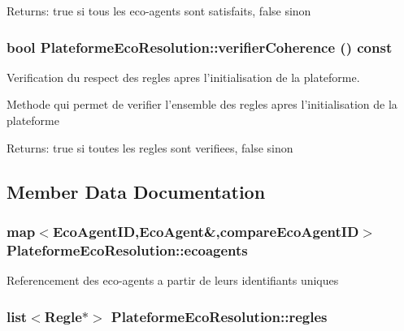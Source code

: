 \begin{Desc}
\item[Returns:]true si tous les eco-agents sont satisfaits, false sinon \end{Desc}
\hypertarget{classPlateformeEcoResolution_0d35ee702a0b255f0da91aa382089865}{
\subsubsection[{verifierCoherence}]{\setlength{\rightskip}{0pt plus 5cm}bool PlateformeEcoResolution::verifierCoherence () const}}
\label{classPlateformeEcoResolution_0d35ee702a0b255f0da91aa382089865}


Verification du respect des regles apres l'initialisation de la plateforme. 

Methode qui permet de verifier l'ensemble des regles apres l'initialisation de la plateforme

\begin{Desc}
\item[Returns:]true si toutes les regles sont verifiees, false sinon \end{Desc}


\subsection{Member Data Documentation}
\hypertarget{classPlateformeEcoResolution_02de97d0d9dac3719ceaadfb255492a3}{
\subsubsection[{ecoagents}]{\setlength{\rightskip}{0pt plus 5cm}map$<${\bf EcoAgentID},{\bf EcoAgent}\&,{\bf compareEcoAgentID}$>$ {\bf PlateformeEcoResolution::ecoagents}}}
\label{classPlateformeEcoResolution_02de97d0d9dac3719ceaadfb255492a3}


Referencement des eco-agents a partir de leurs identifiants uniques \hypertarget{classPlateformeEcoResolution_4f7dc37edf042a189073f15771604e35}{
\subsubsection[{regles}]{\setlength{\rightskip}{0pt plus 5cm}list$<${\bf Regle}$\ast$$>$ {\bf PlateformeEcoResolution::regles}}}
\label{classPlateformeEcoResolution_4f7dc37edf042a189073f15771604e35}


